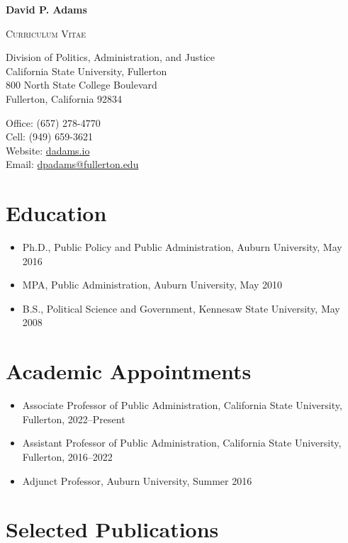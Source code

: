 \documentclass[12pt,letterpaper]{article}
\def\name{David P. Adams}
\begin{document}
\centerline{\huge \bf \name}
\smallskip
\centerline{\small{\textsc{Curriculum Vitae}}}

\bigskip

\noindent
\begin{minipage}[t]{0.55\textwidth}
    Division of Politics, Administration, and Justice \\
    California State University, Fullerton \\
    800 North State College Boulevard \\
    Fullerton, California 92834
\end{minipage}
\hspace{1in}
\begin{minipage}[t]{0.375\textwidth}
    Office: (657) 278-4770 \\
    Cell: (949) 659-3621 \\
    Website: \href{https://dadams.io}{dadams.io} \\
    Email: \href{mailto:dpadams@fullerton.edu}{dpadams@fullerton.edu}
\end{minipage}

\section*{Education}
\begin{itemize}
  \item Ph.D., Public Policy and Public Administration, Auburn University, May 2016
  \item MPA, Public Administration, Auburn University, May 2010
  \item B.S., Political Science and Government, Kennesaw State University, May 2008
\end{itemize}

\section*{Academic Appointments}
\begin{itemize}
  \item Associate Professor of Public Administration, California State University, Fullerton, 2022--Present
  \item Assistant Professor of Public Administration, California State University, Fullerton, 2016--2022
  \item Adjunct Professor, Auburn University, Summer 2016
\end{itemize}

\section*{Selected Publications}
\end{document}
